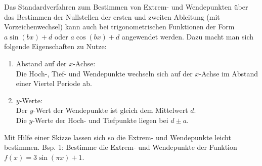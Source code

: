 Das Standardverfahren zum Bestimmen von Extrem- und Wendepunkten über das Bestimmen der Nullstellen der ersten und zweiten Ableitung (mit Vorzeichenwechsel) kann auch bei trigonometrischen Funktionen der Form \(a\sin(bx)+d\) oder \(a\cos(bx)+d\) angewendet werden. Dazu macht man sich folgende Eigenschaften zu Nutze:
\begin{enumerate}
	\item Abstand auf der \(x\)-Achse:\\ \textcolor{loes}{Die Hoch-, Tief- und Wendepunkte wechseln sich auf der \(x\)-Achse im Abstand einer Viertel Periode ab.}
	\item \(y\)-Werte:\\ \textcolor{loes}{Der \(y\)-Wert der Wendepunkte ist gleich dem Mittelwert \(d\).\\Die \(y\)-Werte der Hoch- und Tiefpunkte liegen bei \(d\pm a\).} 
\end{enumerate}
Mit Hilfe einer Skizze lassen sich so die Extrem- und Wendepunkte leicht bestimmen. Bsp. 1: Bestimme die Extrem- und Wendepunkte der Funktion \(f(x)=3\sin(\pi x)+1\).\\ \\
\begin{minipage}{\textwidth}
\end{minipage}
